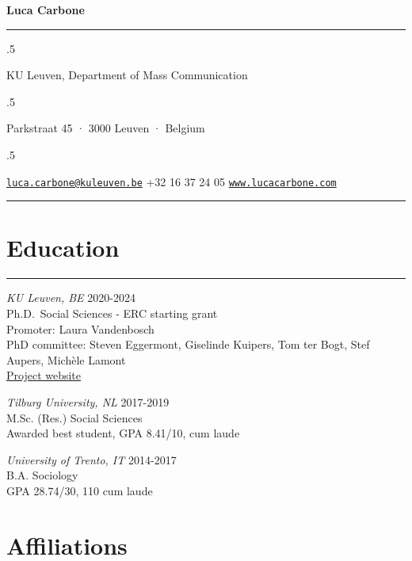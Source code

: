 \documentclass[12pt,]{article}
\begin{document}
\centerline{\huge \bf Luca Carbone}

\vspace{2 mm}

\hrule

\vspace{2 mm}

\moveleft.5\hoffset\centerline{KU Leuven, Department of Mass
Communication}
\moveleft.5\hoffset\centerline{Parkstraat 45 · 3000 Leuven · Belgium}
\moveleft.5\hoffset\centerline{ \faEnvelopeO \hspace{1 mm} \href{mailto:}{\tt \href{mailto:luca.carbone@kuleuven.be}{\nolinkurl{luca.carbone@kuleuven.be}}} \hspace{1 mm}  \faPhone \hspace{1 mm}  +32
16 37 24
05  \hspace{1 mm}      \faGlobe \hspace{1 mm} \href{http://www.lucacarbone.com}{\tt www.lucacarbone.com}   } 

\vspace{2 mm}

\hrule


\hypertarget{education}{%
\section{Education}\label{education}}

\vspace{-10pt}
\rule{1\linewidth}{\linethickness}

\emph{KU Leuven, BE} \hfill \begingroup\small 2020-2024\endgroup\\
Ph.D.~Social Sciences - ERC starting grant\\
Promoter: Laura Vandenbosch\\
PhD committee: Steven Eggermont, Giselinde Kuipers, Tom ter Bogt, Stef
Aupers, Michèle Lamont\\
\href{http://www.projectmimic.eu}{Project website}

\emph{Tilburg University, NL}
\hfill \begingroup\small 2017-2019\endgroup\\
M.Sc. (Res.) Social Sciences\\
Awarded best student, GPA 8.41/10, cum laude

\emph{University of Trento, IT}
\hfill \begingroup\small 2014-2017\endgroup\\
B.A. Sociology\\
GPA 28.74/30, 110 cum laude

\hypertarget{affiliations}{%
\section{Affiliations}\label{affiliations}}
\end{document}
